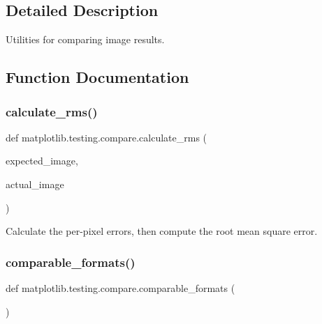 \subsection{Detailed Description}
\begin{DoxyVerb}Utilities for comparing image results.
\end{DoxyVerb}
 

\subsection{Function Documentation}
\mbox{\label{namespacematplotlib_1_1testing_1_1compare_a2037ee97b13d2baa4e243a239dda5ce3}} 
\subsubsection{\texorpdfstring{calculate\+\_\+rms()}{calculate\_rms()}}
{\footnotesize\ttfamily def matplotlib.\+testing.\+compare.\+calculate\+\_\+rms (\begin{DoxyParamCaption}\item[{}]{expected\+\_\+image,  }\item[{}]{actual\+\_\+image }\end{DoxyParamCaption})}

\begin{DoxyVerb}Calculate the per-pixel errors, then compute the root mean square error.
\end{DoxyVerb}
 \mbox{\label{namespacematplotlib_1_1testing_1_1compare_af7dc5b0b19a6b50cca0100898c47bc2b}} 
\subsubsection{\texorpdfstring{comparable\+\_\+formats()}{comparable\_formats()}}
{\footnotesize\ttfamily def matplotlib.\+testing.\+compare.\+comparable\+\_\+formats (\begin{DoxyParamCaption}{ }\end{DoxyParamCaption})}

